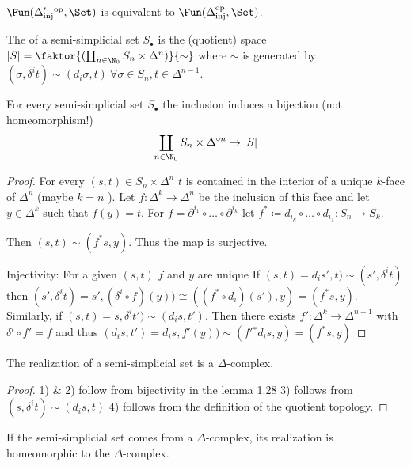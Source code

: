 \begin{remark}
    $\Fun(\Delta_{\text{inj}}'{}^{\text{op}}, \Set)$ is equivalent to $\Fun(\Delta_\text{inj}^{\text{op}}, \Set)$.
\end{remark}

\begin{definition}
    The  of a semi-simplicial set $S_{\bullet}$ is the (quotient) space $|S| = \faktor{(\coprod_{n \in  \N_0} S_n \times \Delta^n)}{\sim}$
    where $\sim $ is generated by $(\sigma, \delta^i t) \sim (d_i \sigma, t) ~ \forall \sigma \in  S_n, t \in  \Delta^{n-1}$.
\end{definition}


\begin{lemma}
    For every semi-simplicial set $S_\bullet$ the inclusion induces a bijection (not homeomorphism!) 
    \[
    \coprod_{n \in  \N_0} S_n \times \Delta^{\circ n} \to  | S|
    \] 
\end{lemma}
\begin{proof}
    For every $(s,t) \in  S_n \times  \Delta^n$ $t$ is contained in the interior of a unique  $k$-face of $\Delta^n$ (maybe $k = n$ ).
    Let $f: \Delta^k \to  \Delta^n$ be the inclusion of this face and let $y \in \Delta^k$ such that $f(y) = t$. 
    For  $f = \partial^{i_1} \circ \ldots \circ \partial^{i_k}$ let $f^{\ast} \coloneqq d_{i_k} \circ \ldots \circ d_{i_1} : S_n \to  S_k$.

    Then $(s,t) \sim (f^\ast s , y)$.
    Thus the map is surjective.

    Injectivity: For a given $(s,t)$ $f$ and $y$ are unique
    If $(s,t) = d_i s',t) \sim  (s', \delta^i t)$ then $(s', \delta^i t) = s', (\delta^i \circ f)(y)) \cong ((f^\ast \circ d_i)(s'), y) = (f^\ast s, y)$.
    Similarly, if $(s,t) = s, \delta^i t') \sim  (d_i s, t')$.
    Then there exists $f': \Delta^k \to  \Delta^{n-1}$ with $\delta^i \circ f' = f$
    and thus  $(d_i s, t') = d_i s, f'(y)) \sim (f'{}^\ast d_i s, y) = (f^\ast s,y)$ %
\end{proof}
\begin{corollary}
     The realization of a semi-simplicial set is a $\Delta$-complex.
\end{corollary}
\begin{proof}
    1) \& 2) follow from bijectivity in the lemma 1.28 %
    3) follows from $(s, \delta^i t) \sim  (d_i s, t) $ %
    4) follows from the definition of the quotient topology.
\end{proof}

\begin{remark} %
    If the semi-simplicial set comes from a $\Delta$-complex, its realization is homeomorphic to the $\Delta$-complex.
\end{remark}

